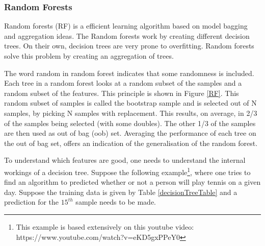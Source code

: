 
\subsubsection{Random Forests}
Random forests (RF)  is a efficient learning algorithm based on model bagging and aggregation ideas\citep{rfPaper}. The Random forests work by creating different decision trees. On their own, decision trees are very prone to overfitting. Random forests solve this problem by creating an aggregation of trees. 

\npar

The word random in random forest indicates that some randomness is included. Each tree in a random forest looks at a random subset of the samples and a random subset of the features. This principle is shown in Figure \ref{RF}. This random subset of samples is called the bootstrap sample and is selected out of N samples, by picking N samples with replacement. This results, on average, in 2/3 of the samples being selected (with some doubles). The other 1/3 of the samples are then used as out of bag (oob)  set. Averaging the performance of each tree on the out of bag set, offers an indication of the generalisation of the random forest.


\npar

To understand which features are good, one needs to understand the internal workings of a decision tree. Suppose the following example\footnote{This example is based extensively on this youtube video: https://www.youtube.com/watch?v=eKD5gxPPeY0}, where one tries to find an algorithm to predicted whether or not a person will play tennis on a given day. Suppose the training data is given by Table \ref{decisionTreeTable} and a prediction for the $15^{th}$ sample needs to be made.

